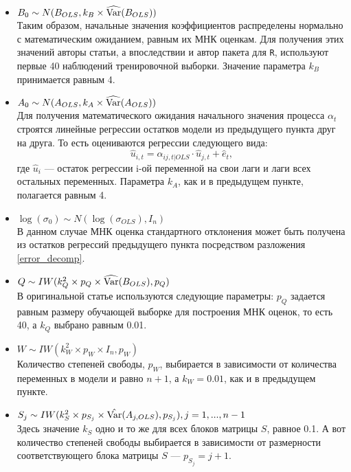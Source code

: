 \begin{itemize}
\item $B_0 \sim N(B_{OLS}, k_B\times\widehat{{\rm Var}}(B_{OLS}))$\\
Таким образом, начальные значения коэффициентов распределены нормально с математическим ожиданием, равным их МНК оценкам. Для получения этих значений авторы статьи, а впоследствии и автор пакета для \texttt{R}, используют первые 40 наблюдений тренировочной выборки. Значение параметра $k_B$ принимается равным 4. 

\item $A_0 \sim N(A_{OLS}, k_A \times \widehat{{\rm Var}}(A_{OLS}))$\\
Для получения математического ожидания начального значения процесса $\alpha_t$ строятся линейные регрессии остатков модели из предыдущего пункта друг на друга. То есть оцениваются регрессии следующего вида:
\begin{equation*}
\hat{u}_{i,t} = \alpha_{ij,t|OLS}\cdot \hat{u}_{j,t} +\hat{e}_t,
\end{equation*}
где $\hat{u}_{i}$ --- остаток регрессии i-ой переменной на свои лаги и лаги всех остальных переменных. Параметра $k_A$, как и в предыдущем пункте, полагается равным 4.

\item $\log (\sigma_0) \sim N(\log(\sigma_{OLS}), I_n)$\\
В данном случае МНК оценка стандартного отклонения может быть получена из остатков регрессий предыдущего пункта посредством разложения \eqref{error_decomp}.

\item $Q \sim IW(k_Q^2 \times p_Q\times \widehat{{\rm Var}}(B_{OLS}), p_Q)$\\
В оригинальной статье используются следующие параметры: $p_Q$ задается равным размеру обучающей выборке для построения МНК оценок, то есть 40, а $k_Q$ выбрано равным 0.01. 

\item $W \sim IW(k_W^2\times p_W\times I_n, p_W)$\\
Количество степеней свободы, $p_W$, выбирается в зависимости от количества переменных в модели и равно $n+1$, а $k_W = 0.01$, как и в предыдущем пункте.

\item $S_j \sim IW(k_S^2\times p_{S_j}\times \hat{{\rm Var}}(A_{j,OLS}), p_{S_j}), j = 1,...,n-1$\\
Здесь значение $k_S$ одно и то же для всех блоков матрицы $S$, равное 0.1. А вот количество степеней свободы выбирается в зависимости от размерности соответствующего блока матрицы $S$ --- $p_{S_j} = j+1$.
\end{itemize}


